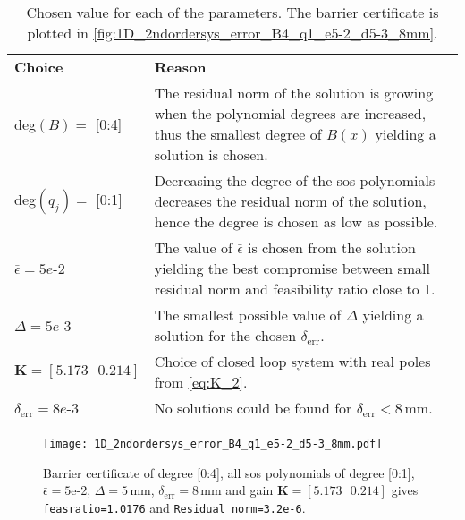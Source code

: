 \begin{table}[htbp]
	\begin{tabularx}{\textwidth}{l X}
		\rowcolor{HeaderBlue}
		\textbf{Choice} & \textbf{Reason}\\
		deg$(B)=$ [0:4] & %
		The residual norm of the solution is growing when the polynomial degrees are increased, thus the smallest degree of $B(x)$ yielding a solution is chosen. 
		\\
		\rowcolor{textBlue}
		deg$(q_j)=$ [0:1] & Decreasing the degree of the \gls{sos} polynomials decreases the residual norm of the solution, hence the degree is chosen as low as possible.\\
		$\bar{\epsilon}=5e$-2 & The value of $\bar{\epsilon}$ is chosen from the solution yielding the best compromise between small residual norm and feasibility ratio close to 1. \\
		\rowcolor{textBlue}
		$\Delta=5e$-3 & The smallest possible value of $\Delta$ yielding a solution for the chosen $\delta_\text{err}$.\\
		$\textbf{K}=[5.173  \,\,\,\,  0.214]$ & Choice of closed loop system with real poles from \autoref{eq:K_2}.\\
		\rowcolor{textBlue}
		$\delta_\text{err}=8e$-3 & No solutions could be found for $\delta_\text{err}<8$\,mm.
	\end{tabularx}
	\caption{Chosen value for each of the parameters. The barrier certificate is plotted in \autoref{fig:1D_2ndordersys_error_B4_q1_e5-2_d5-3_8mm}.}
	\label{tab:sostools_choice_error2}
\end{table}

\begin{figure}[H]
	\centering
	\texttt{[image: 1D\_2ndordersys\_error\_B4\_q1\_e5-2\_d5-3\_8mm.pdf]}
	\caption{Barrier certificate of degree [0:4], all \gls{sos} polynomials of degree [0:1], $\bar{\epsilon}=5$e-2, $\Delta=5$\,mm, $\delta_\text{err}=8$\,mm and gain $\textbf{K}=[5.173  \,\,\,\,  0.214]$ gives \texttt{feasratio=1.0176} and \texttt{Residual norm=3.2e-6}.}
	\label{fig:1D_2ndordersys_error_B4_q1_e5-2_d5-3_8mm}
\end{figure}


